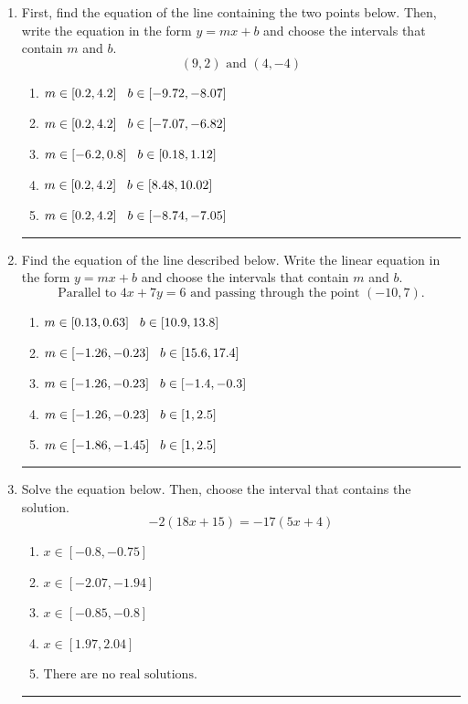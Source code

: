 \documentclass[14pt]{extbook}
\newcommand{\litem}[1]{\item#1\hspace*{-1cm}\rule{\textwidth}{0.4pt}}
\begin{document}
\begin{enumerate}
{\begin{enumerate}[label=\Alph*.]
\end{enumerate} }
\litem{
First, find the equation of the line containing the two points below. Then, write the equation in the form $ y=mx+b $ and choose the intervals that contain $m$ and $b$.\[ (9, 2) \text{ and } (4, -4) \]\begin{enumerate}[label=\Alph*.]
\item \( m \in [0.2, 4.2] \hspace*{3mm} b \in [-9.72, -8.07] \)
\item \( m \in [0.2, 4.2] \hspace*{3mm} b \in [-7.07, -6.82] \)
\item \( m \in [-6.2, 0.8] \hspace*{3mm} b \in [0.18, 1.12] \)
\item \( m \in [0.2, 4.2] \hspace*{3mm} b \in [8.48, 10.02] \)
\item \( m \in [0.2, 4.2] \hspace*{3mm} b \in [-8.74, -7.05] \)

\end{enumerate} }
\litem{
Find the equation of the line described below. Write the linear equation in the form $ y=mx+b $ and choose the intervals that contain $m$ and $b$.\[ \text{Parallel to } 4 x + 7 y = 6 \text{ and passing through the point } (-10, 7). \]\begin{enumerate}[label=\Alph*.]
\item \( m \in [0.13, 0.63] \hspace*{3mm} b \in [10.9, 13.8] \)
\item \( m \in [-1.26, -0.23] \hspace*{3mm} b \in [15.6, 17.4] \)
\item \( m \in [-1.26, -0.23] \hspace*{3mm} b \in [-1.4, -0.3] \)
\item \( m \in [-1.26, -0.23] \hspace*{3mm} b \in [1, 2.5] \)
\item \( m \in [-1.86, -1.45] \hspace*{3mm} b \in [1, 2.5] \)

\end{enumerate} }
\litem{
Solve the equation below. Then, choose the interval that contains the solution.\[ -2(18x + 15) = -17(5x + 4) \]\begin{enumerate}[label=\Alph*.]
\item \( x \in [-0.8, -0.75] \)
\item \( x \in [-2.07, -1.94] \)
\item \( x \in [-0.85, -0.8] \)
\item \( x \in [1.97, 2.04] \)
\item \( \text{There are no real solutions.} \)


\end{enumerate}}
\end{enumerate}
\end{document}

